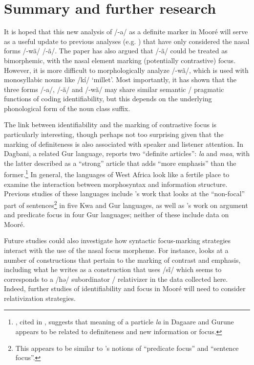 \documentclass[output=paper]{langsci/langscibook}
\begin{document}
\section{Summary and further research}\label{sec:teo:8}

It is hoped that this new analysis of /-a/ as a definite marker in Mooré will serve as a useful update to previous analyses (e.g. \citealt{Peterson1971,canu1974}) that have only considered the nasal forms /-wã/ {\Tilde} /-ã/. The paper has also argued that /-ã/ could be treated as bimorphemic, with the nasal element marking (potentially contrastive) focus. However, it is more difficult to morphologically analyze /-wã/, which is used with monosyllabic nouns like /kí/ ‘millet’. Most importantly, it has shown that the three forms /-a/, /-ã/ and /-wã/ may share similar semantic / pragmatic functions of coding identifiability, but this depends on the underlying phonological form of the noun class suffix.

The link between identifiability and the marking of contrastive focus is particularly interesting, though perhaps not too surprising given that the marking of definiteness is also associated with speaker and listener attention. In Dagbani, a related Gur language, \citet[40]{Olawsky1999} reports two “definite articles”: \textit{la} and \textit{maa}, with the latter described as a “strong” article that adds “more emphasis” than the former.\footnote{\cite{KroppDakubu1991}, cited in \citet[30]{Olawsky1999}, suggests that meaning of a particle \textit{la} in Dagaare and Gurune appears to be related to definiteness and new information or focus.} In general, the languages of West Africa look like a fertile place to examine the interaction between morphosyntax and information structure. Previous studies of these languages include \cite{FiedlerSchwarz2005}'s work that looks at the “non-focal” part of sentences\footnote{This appears to be similar to \cite{Lambrecht1994}'s notions of “predicate focus” and “sentence focus”.} in five Kwa and Gur languages, as well as \cite{Schwarz2010gur}'s work on argument and predicate focus in four Gur languages; neither of these include data on Mooré.

Future studies could also investigate how syntactic focus-marking strategies interact with the use of the nasal focus morpheme. For instance, \citet[445-450]{Kabore1985} looks at a number of constructions that pertain to the marking of contrast and emphasis, including what he writes as a construction that uses /s\~{i}/ which seems to corresponds to a /hə/ subordinator / relativizer in the data collected here. Indeed, further studies of identifiability and focus in Mooré will need to consider relativization strategies.
\end{document}
